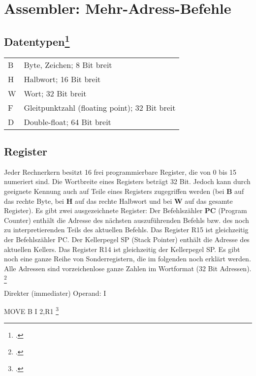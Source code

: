 \documentclass{lehramt-informatik-haupt}
\begin{document}

\chapter{Assembler: Mehr-Adress-Befehle}



\section{Datentypen\footcite[Seite 6]{borghoff}}

\begin{tabular}{ll}
B & Byte, Zeichen; 8 Bit breit\\
H & Halbwort; 16 Bit breit\\
W & Wort; 32 Bit breit\\
F & Gleitpunktzahl (floating point); 32 Bit breit\\
D & Double-float; 64 Bit breit\\
\end{tabular}

\section{Register}

Jeder Rechnerkern besitzt 16 frei programmierbare Register, die von 0
bis 15 numeriert sind. Die Wortbreite eines Registers beträgt 32 Bit.
Jedoch kann durch geeignete Kennung auch auf Teile eines Registers
zugegriffen werden (bei \textbf{B} auf das rechte Byte, bei \textbf{H}
auf das rechte Halbwort und bei \textbf{W} auf das gesamte Register). Es
gibt zwei ausgezeichnete Register: Der Befehlszähler \textbf{PC}
(Program Counter) enthält die Adresse des nächsten auszuführenden
Befehls bzw. des noch zu interpretierenden Teils des aktuellen Befehls.
Das Register R15 ist gleichzeitig der Befehlszähler PC. Der Kellerpegel
SP (Stack Pointer) enthält die Adresse des aktuellen Kellers. Das
Register R14 ist gleichzeitig der Kellerpegel SP. Es gibt noch eine
ganze Reihe von Sonderregistern, die im folgenden noch erklärt werden.
Alle Adressen sind vorzeichenlose ganze Zahlen im Wortformat (32 Bit
Adressen).
\footcite[Seite 8, 9]{borghoff}

Direkter (immediater) Operand: I

MOVE B I 2,R1
\footcite[Seite 24]{borghoff}

\literatur
\end{document}
